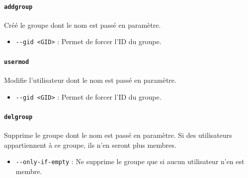 \paragraph{\texttt{addgroup}} 
Créé le groupe dont le nom est passé en paramètre.
\begin{itemize}
    \item \texttt{-{}-gid <GID>} : Permet de forcer l'ID du groupe.
\end{itemize}\vspace{\baselineskip}


\paragraph{\texttt{usermod}} 
Modifie l'utilisateur dont le nom est passé en paramètre.
\begin{itemize}
    \item \texttt{-{}-gid <GID>} : Permet de forcer l'ID du groupe.
\end{itemize}\vspace{\baselineskip}

\paragraph{\texttt{delgroup}} 
Supprime le groupe dont le nom est passé en paramètre. Si des utilisateurs appartiennent à ce groupe, ils n'en seront plus membres.
\begin{itemize}
    \item \texttt{-{}-only-if-empty} : Ne supprime le groupe que si aucun utilisateur n'en est membre.
\end{itemize}\vspace{\baselineskip}